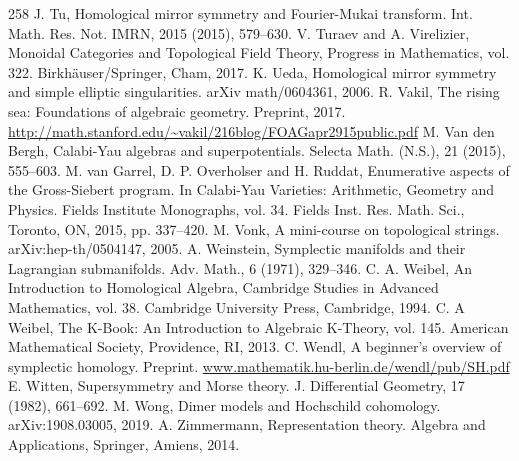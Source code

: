 \begin{thebibliography}{258}
\hypertarget{ref:245}{} J. Tu, Homological mirror symmetry and Fourier-Mukai transform. Int. Math. Res. Not. IMRN, 2015 (2015), 579–630.
\hypertarget{ref:246}{} V. Turaev and A. Virelizier, Monoidal Categories and Topological Field Theory, Progress in Mathematics, vol. 322. Birkhäuser/Springer, Cham, 2017.
\hypertarget{ref:247}{} K. Ueda, Homological mirror symmetry and simple elliptic singularities. arXiv math/0604361, 2006.
\hypertarget{ref:248}{} R. Vakil, The rising sea: Foundations of algebraic geometry. Preprint, 2017. \url{http://math.stanford.edu/~vakil/216blog/FOAGapr2915public.pdf}
\hypertarget{ref:249}{} M. Van den Bergh, Calabi-Yau algebras and superpotentials. Selecta Math. (N.S.), 21 (2015), 555–603.
\hypertarget{ref:250}{} M. van Garrel, D. P. Overholser and H. Ruddat, Enumerative aspects of the Gross-Siebert program. In Calabi-Yau Varieties: Arithmetic, Geometry and Physics. Fields Institute Monographs, vol. 34. Fields Inst. Res. Math. Sci., Toronto, ON, 2015, pp. 337–420.
\hypertarget{ref:251}{} M. Vonk, A mini-course on topological strings. arXiv:hep-th/0504147, 2005.
\hypertarget{ref:252}{} A. Weinstein, Symplectic manifolds and their Lagrangian submanifolds. Adv. Math., 6 (1971), 329–346.
\hypertarget{ref:253}{} C. A. Weibel, An Introduction to Homological Algebra, Cambridge Studies in Advanced Mathematics, vol. 38. Cambridge University Press, Cambridge, 1994.
\hypertarget{ref:254}{} C. A Weibel, The K-Book: An Introduction to Algebraic K-Theory, vol. 145. American Mathematical Society, Providence, RI, 2013.
\hypertarget{ref:255}{} C. Wendl, A beginner’s overview of symplectic homology. Preprint. \url{www.mathematik.hu-berlin.de/wendl/pub/SH.pdf}
\hypertarget{ref:256}{} E. Witten, Supersymmetry and Morse theory. J. Differential Geometry, 17 (1982), 661–692.
\hypertarget{ref:257}{} M. Wong, Dimer models and Hochschild cohomology. arXiv:1908.03005, 2019.
\hypertarget{ref:258}{} A. Zimmermann, Representation theory. Algebra and Applications, Springer, Amiens, 2014.
\end{thebibliography}
